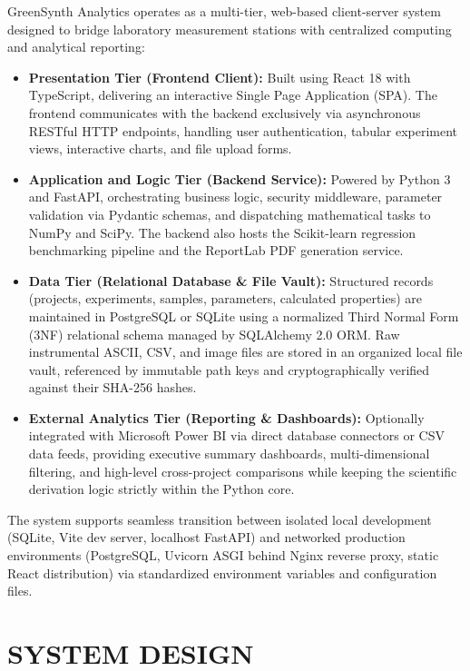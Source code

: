 \documentclass[12pt,a4paper,oneside]{report}
\begin{document}
{{{GreenSynth Analytics operates as a multi-tier, web-based client-server system designed to bridge laboratory measurement stations with centralized computing and analytical reporting:

\begin{itemize}
    \item \textbf{Presentation Tier (Frontend Client):} Built using React 18 with TypeScript, delivering an interactive Single Page Application (SPA). The frontend communicates with the backend exclusively via asynchronous RESTful HTTP endpoints, handling user authentication, tabular experiment views, interactive charts, and file upload forms.
    \item \textbf{Application and Logic Tier (Backend Service):} Powered by Python 3 and FastAPI, orchestrating business logic, security middleware, parameter validation via Pydantic schemas, and dispatching mathematical tasks to NumPy and SciPy. The backend also hosts the Scikit-learn regression benchmarking pipeline and the ReportLab PDF generation service.
    \item \textbf{Data Tier (Relational Database \& File Vault):} Structured records (projects, experiments, samples, parameters, calculated properties) are maintained in PostgreSQL or SQLite using a normalized Third Normal Form (3NF) relational schema managed by SQLAlchemy 2.0 ORM. Raw instrumental ASCII, CSV, and image files are stored in an organized local file vault, referenced by immutable path keys and cryptographically verified against their SHA-256 hashes.
    \item \textbf{External Analytics Tier (Reporting \& Dashboards):} Optionally integrated with Microsoft Power BI via direct database connectors or CSV data feeds, providing executive summary dashboards, multi-dimensional filtering, and high-level cross-project comparisons while keeping the scientific derivation logic strictly within the Python core.
\end{itemize}

The system supports seamless transition between isolated local development (SQLite, Vite dev server, localhost FastAPI) and networked production environments (PostgreSQL, Uvicorn ASGI behind Nginx reverse proxy, static React distribution) via standardized environment variables and configuration files.



\chapter{SYSTEM DESIGN}

}}}
\end{document}
